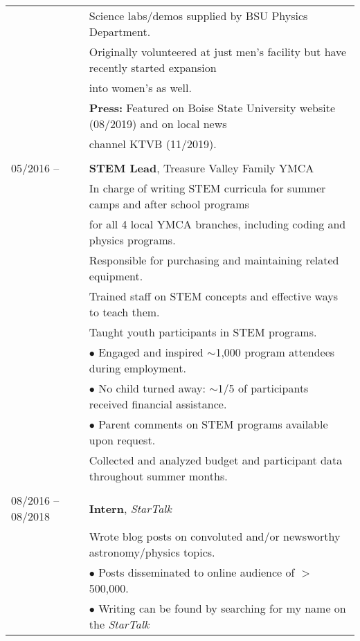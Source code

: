 \documentclass[11pt]{article}
\begin{document}
\begin{tabular}{ll}
      & Science labs/demos supplied by BSU Physics Department.\\
      & Originally volunteered at just men's facility but have recently started expansion \\
      & into women's as well.\vspace{1mm} \\
      & \textbf{Press:} Featured on Boise State University website (08/2019) and on local news \\
      & channel KTVB (11/2019). \\
      & \\
05/2016 --    &   \textbf{STEM Lead}, Treasure Valley Family YMCA \vspace{1mm} \\
      & In charge of writing STEM curricula for summer camps and after school programs \\
      & for all 4 local YMCA branches, including coding and physics programs. \vspace{0.5mm}\\
      & Responsible for purchasing and maintaining related equipment. \vspace{0.5mm}\\
      & Trained staff on STEM concepts and effective ways to teach them. \vspace{0.5mm} \\
      & Taught youth participants in STEM programs. \\
      & $\bullet$ Engaged and inspired $\sim$1,000 program attendees during employment. \\
      & $\bullet$ No child turned away: $\sim$1/5 of participants received financial assistance. \\
      & $\bullet$ Parent comments on STEM programs available upon request. \vspace{1mm} \\
      & Collected and analyzed budget and participant data throughout summer months. \\
      & \\
08/2016 -- 08/2018    &   \textbf{Intern}, \textit{StarTalk} \vspace{1mm} \\
      & Wrote blog posts on convoluted and/or newsworthy astronomy/physics topics. \\
      & $\bullet$ Posts disseminated to online audience of $>$500,000. \\
      & $\bullet$ Writing can be found by searching for my name on the \textit{StarTalk} \\

\end{tabular}
\end{document}
